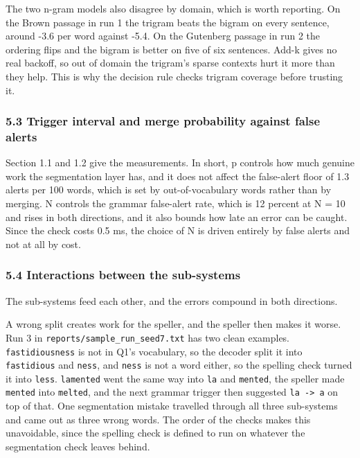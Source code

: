 \documentclass[11pt,a4paper]{article}
\begin{document}
The two n-gram models also disagree by domain, which is worth reporting. On the Brown passage in run 1 the trigram beats the bigram on every sentence, around -3.6 per word against -5.4. On the Gutenberg passage in run 2 the ordering flips and the bigram is better on five of six sentences. Add-k gives no real backoff, so out of domain the trigram's sparse contexts hurt it more than they help. This is why the decision rule checks trigram coverage before trusting it.

\subsubsection*{5.3 Trigger interval and merge probability against false alerts}

Section 1.1 and 1.2 give the measurements. In short, p controls how much genuine work the segmentation layer has, and it does not affect the false-alert floor of 1.3 alerts per 100 words, which is set by out-of-vocabulary words rather than by merging. N controls the grammar false-alert rate, which is 12 percent at N = 10 and rises in both directions, and it also bounds how late an error can be caught. Since the check costs 0.5 ms, the choice of N is driven entirely by false alerts and not at all by cost.

\subsubsection*{5.4 Interactions between the sub-systems}

The sub-systems feed each other, and the errors compound in both directions.

A wrong split creates work for the speller, and the speller then makes it worse. Run 3 in \texttt{reports/\allowbreak{}sample\_\allowbreak{}run\_\allowbreak{}seed7.\allowbreak{}txt} has two clean examples. \texttt{fastidiousness} is not in Q1's vocabulary, so the decoder split it into \texttt{fastidious} and \texttt{ness}, and \texttt{ness} is not a word either, so the spelling check turned it into \texttt{less}. \texttt{lamented} went the same way into \texttt{la} and \texttt{mented}, the speller made \texttt{mented} into \texttt{melted}, and the next grammar trigger then suggested \texttt{la -\allowbreak{}> a} on top of that. One segmentation mistake travelled through all three sub-systems and came out as three wrong words. The order of the checks makes this unavoidable, since the spelling check is defined to run on whatever the segmentation check leaves behind.
\end{document}
